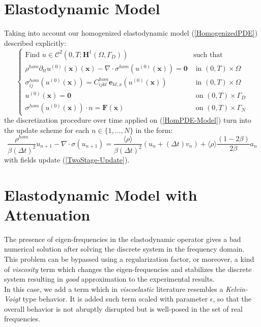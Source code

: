 \section{Elastodynamic Model}
Taking into account our homogenized elastodynamic model (\ref{HomogenizedPDE}) described explicitly:
\begin{equation}
    \label{HomPDE-Model}
    \left \{
    \begin{array}{cc}
        \text{Find $u \in \mathcal{C}^2(0,T;\mathbf{H}^1(\Omega, \Gamma_D))$} & \text{such that} \\
        \rho^{hom} \partial_{tt} u^{(0)}(\mathbf{x}) (\mathbf{x}) - \nabla \cdot \sigma^{hom} (u^{(0)}(\mathbf{x}) ) = \mathbf{0} & \text{ in } (0,T)\times \Omega \\
        \sigma^{hom}_{ij}(u^{(0)}(\mathbf{x})) = C^{hom}_{ijkl}\mathbf{e}_{kl,x}(u^{(0)}(\mathbf{x})) & \text{ in } (0,T)\times \Omega \\
        u^{(0)}(\mathbf{x}) = \mathbf{0} & \text{ on } (0,T)\times \Gamma_D \\
        \sigma^{hom}(u^{(0)}(\mathbf{x})) \cdot n = \mathbf{F}(\mathbf{x}) & \text{ on } (0,T)\times \Gamma_N
    \end{array}
    \right .
\end{equation}
the discretization procedure over time applied on (\ref{HomPDE-Model}) turn into the update scheme for each $n \in \{1,\dots, N\}$ in the form:
\begin{equation*}
    \label{HomPDE-TimeUpdate}
    \frac{\rho^{hom}}{\beta (\Delta t)^2} u_{n+1} - \nabla \cdot \sigma(u_{n+1}) = \frac{\langle\rho\rangle}{\beta (\Delta t)^2} ( u_{n} + (\Delta t) v_n ) + \langle\rho\rangle\frac{(1-2\beta)}{2\beta} a_n
\end{equation*}
with fields update (\ref{TwoStage-Update}).

\section{Elastodynamic Model with Attenuation}
The presence of eigen-frequencies in the elastodynamic operator gives a bad numerical solution after solving the discrete system in the frequency domain. This problem can be bypassed using a regularization factor, or moreover, a kind of \textit{viscosity} term which changes the eigen-frequencies and stabilizes the discrete system resulting in \textit{good} approximation to the experimental results.\\
In this case, we add a term which in \textit{viscoelastic} literature resembles a \textit{Kelvin-Voigt} type behavior. It is added such term scaled with parameter $\epsilon$, so that the overall behavior is not abruptly disrupted but is well-posed in the set of real frequencies.


